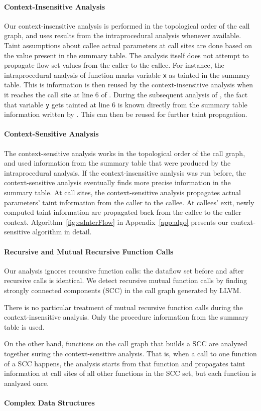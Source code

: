 \paragraph{Context-Insensitive Analysis}
Our context-insensitive analysis is performed
in the topological order of the call graph, and uses
results from the intraprocedural analysis whenever
available. Taint assumptions about callee actual
parameters at call sites are done based on the value
present in the summary table. The analysis itself does not
attempt to propagate flow set values from the caller
to the callee.
For instance, the intraprocedural analysis of function
\main{} marks variable \texttt{x} as tainted in the
summary table. This is information is then reused by
the context-insensitive analysis when it reaches the
call site at line $6$ of \main{}.
During the subsequent analysis of \main{}, the fact that
variable \texttt{y} gets tainted at line $6$ is known
directly from the summary table information written
by \compute{}. This can then be reused for further
taint propagation.

\paragraph{Context-Sensitive Analysis}
The context-sensitive analysis works in the topological order
of the call graph, and used information from the summary table
that were produced by the intraprocedural analysis. If the
context-insensitive analysis was run before, the context-sensitive
analysis eventually finds more precise information in the summary
table.
At call sites, the context-sensitive analysis propagates
actual parameters' taint information from the caller to the
callee. At callees' exit, newly computed taint information
are propagated back from the callee to the caller context.
Algorithm~\ref{fig:csInterFlow} in Appendix~\ref{app:algo}
presents our context-sensitive algorithm in detail.

\paragraph{Recursive and Mutual Recursive Function Calls} 
Our analysis ignores recursive function calls: the dataflow set
before and after recursive calls is identical.
We detect recursive mutual function calls by finding strongly
connected components (SCC) in the call graph generated by LLVM.

There is no particular treatment of mutual recursive function
calls during the context-insensitive analysis. Only the
procedure information from the summary table is used.

On the other hand, functions on the call graph that builds a
SCC are analyzed together suring the context-sensitive analysis.
That is, when a call to one function of a SCC happens,
the analysis starts from that function and propagates taint
information at call sites of all other functions in the SCC set,
but each function is analyzed once.

\paragraph{Complex Data Structures}
